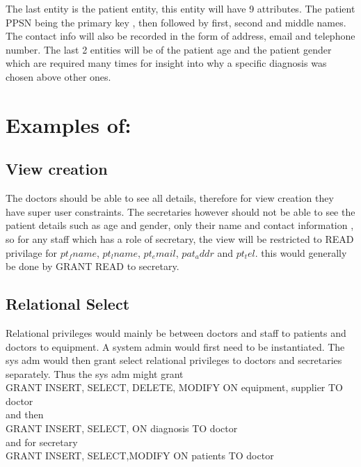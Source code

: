 \documentclass{article}
\begin{document}
The last entity is the patient entity, this entity will have 9 attributes. The patient PPSN being the primary key , then followed by first, second and middle names. The contact info will also be recorded in the form of address, email and telephone number. The last 2 entities will be of the patient age and the patient gender which are required many times for insight into why a specific diagnosis was chosen above other ones.\\




\section{Examples of:}
\subsection{View creation}
The doctors should be able to see all details, therefore for view creation they have super user constraints. The secretaries however should not be able to see the patient details such as age and gender, only their name and contact information , so for any staff which has a role of secretary, the view will be restricted to READ privilage for $pt_fname$, $pt_lname$, $pt_email$, $pat_addr$ and $pt_tel$. 
this would generally be done by GRANT READ to secretary.






\subsection{Relational Select}
Relational privileges would mainly be between doctors and staff to patients and doctors to equipment.
A system admin would first need to be instantiated. The sys adm would then grant select relational privileges to doctors and secretaries separately. Thus the sys adm might 
grant\\ 
GRANT	INSERT,	SELECT,	DELETE, MODIFY ON	equipment, supplier	TO	
doctor\\

and then\\
GRANT	INSERT,	SELECT,	ON	diagnosis	TO	doctor\\

and for secretary\\
GRANT	INSERT,	SELECT,MODIFY	ON	patients	TO	doctor\\
\end{document}
